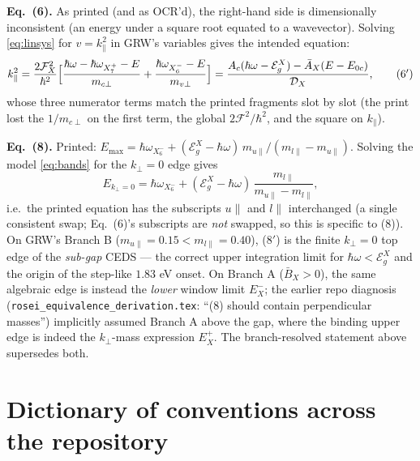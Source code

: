 \documentclass[11pt,a4paper]{article}
\numberwithin{equation}{section}
\newcommand{\hw}{\hbar\omega}
\newcommand{\EgX}{\mathcal{E}_g^{X}}
\newcommand{\cD}{\mathcal{D}}
\newcommand{\cF}{\mathcal{F}}
\newcommand{\Ab}{\bar{A}}
\newcommand{\Bb}{\bar{B}}
\newcommand{\kperp}{k_{\perp}}
\newcommand{\kpar}{k_{\parallel}}
\newcommand{\Ezc}{E_{0c}}
\begin{document}
\textbf{Eq.\ (6).}  As printed (and as OCR'd), the right-hand side is
dimensionally inconsistent (an energy under a square root equated to a
wavevector).  Solving \eqref{eq:linsys} for $v=\kpar^2$ in GRW's
variables gives the intended equation:
\begin{equation}
\kpar^{2}
=\frac{2\cF_X^{2}}{\hbar^{2}}\Bigl[
\frac{\hw-\hbar\omega_{X_7^+}-E}{m_{c\perp}}
+\frac{\hbar\omega_{X_6^-}-E}{m_{v\perp}}\Bigr]
=\frac{A_c(\hw-\EgX)-\Ab_X(E-\Ezc)}{\cD_X},
\tag{6$'$}
\end{equation}
whose three numerator terms match the printed fragments slot by slot
(the print lost the $1/m_{c\perp}$ on the first term, the global
$2\cF^2/\hbar^2$, and the square on $\kpar$).

\medskip
\textbf{Eq.\ (8).}  Printed:
$E_{\max}=\hbar\omega_{X_6^-}
+(\EgX-\hw)\,m_{u\parallel}/(m_{l\parallel}-m_{u\parallel})$.
Solving the model \eqref{eq:bands} for the $\kperp=0$ edge gives
\begin{equation}
E_{\kperp=0}
=\hbar\omega_{X_6^-}
+(\EgX-\hw)\,\frac{m_{l\parallel}}{m_{u\parallel}-m_{l\parallel}},
\tag{8$'$}
\end{equation}
i.e.\ the printed equation has the subscripts $u\parallel$ and
$l\parallel$ interchanged (a single consistent swap; Eq.~(6)'s
subscripts are \emph{not} swapped, so this is specific to (8)).
On GRW's Branch B ($m_{u\parallel}=0.15<m_{l\parallel}=0.40$),
(8$'$) is the finite $\kperp\!=\!0$ top edge of the \emph{sub-gap}
CEDS --- the correct upper integration limit for $\hw<\EgX$ and the
origin of the step-like $1.83$ eV onset.  On Branch A
($\Bb_X>0$), the same algebraic edge is instead the \emph{lower}
window limit $E^-_X$; the earlier repo diagnosis
(\texttt{rosei\_equivalence\_derivation.tex}: ``(8) should contain
perpendicular masses'') implicitly assumed Branch A above the gap,
where the binding upper edge is indeed the $\kperp$-mass expression
$E^+_X$.  The branch-resolved statement above supersedes both.

\section{Dictionary of conventions across the repository}\label{app:dict}
\end{document}
